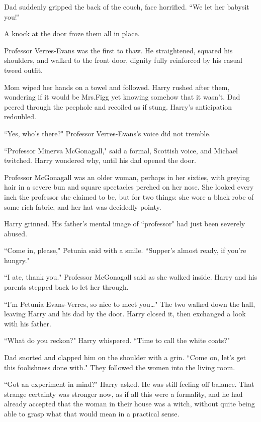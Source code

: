 Dad suddenly gripped the back of the couch, face horrified. ``We let her babysit you!"

A knock at the door froze them all in place.

Professor Verres-Evans was the first to thaw. He straightened, squared his shoulders, and walked to the front door, dignity fully reinforced by his casual tweed outfit.

Mom wiped her hands on a towel and followed. Harry rushed after them, wondering if it would be Mrs.\?Figg yet knowing somehow that it wasn't. Dad peered through the peephole and recoiled as if stung. Harry's anticipation redoubled.

``Yes, who's there?" Professor Verres-Evans's voice did not tremble.

``Professor Minerva McGonagall," said a formal, Scottish voice, and Michael twitched. Harry wondered why, until his dad opened the door.

Professor McGonagall was an older woman, perhaps in her sixties, with greying hair in a severe bun and square spectacles perched on her nose. She looked every inch the professor she claimed to be, but for two things: she wore a black robe of some rich fabric, and her hat was decidedly pointy.

Harry grinned. His father's mental image of ``professor" had just been severely abused.

``Come in, please," Petunia said with a smile. ``Supper's almost ready, if you're hungry."

``I ate, thank you." Professor McGonagall said as she walked inside. Harry and his parents stepped back to let her through.

``I'm Petunia Evans-Verres, so nice to meet you{\ldots}" The two walked down the hall, leaving Harry and his dad by the door. Harry closed it, then exchanged a look with his father.

``What do you reckon?" Harry whispered. ``Time to call the white coats?"

Dad snorted and clapped him on the shoulder with a grin. ``Come on, let's get this foolishness done with." They followed the women into the living room.

``Got an experiment in mind?" Harry asked. He was still feeling off balance. That strange certainty was stronger now, as if all this were a formality, and he had already accepted that the woman in their house was a witch, without quite being able to grasp what that would mean in a practical sense.

